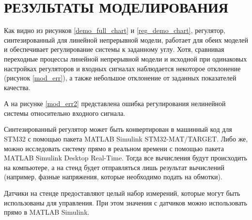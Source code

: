 \section{РЕЗУЛЬТАТЫ МОДЕЛИРОВАНИЯ}

Как видно из рисунков \ref{demo_full_chart} и \ref{reg_demo_chart}, регулятор, 
синтезированный
для линейной непрерывной модели, работает для обеих моделей и 
обеспечивает регулирование системы к заданному углу. Хотя, сравнивая
переходные процессы линейной непрерывной модели и исходной
при одинаковых настройках регуляторов и входных сигналах
наблюдается некоторое отклонение (рисунок \ref{mod_err}), а также 
небольшое отклонение от заданных показателей качества.


А на рисунке \ref{mod_err2} представлена ошибка
регулирования нелинейной системы относительно входного сигнала.


Синтезированный регулятор может быть конвертирован в машинный код
для STM32 с помощью пакета MATLAB Simulink \mbox{STM32-MAT/TARGET}.
Либо же, можно исследовать систему прямо в реальном времени с помощью
пакета MATLAB Simulink Desktop Real-Time. Тогда все вычисления будут
происходить на компьютере, а на стенд будет отправляться лишь результат 
вычислений (например, фазные напряжения, которые необходимо подать на обмотки).

Датчики на стенде предоставляют целый набор измерений, которые
могут быть использованы для управления. При этом значения с датчиков
можно использовать прямо в MATLAB Simulink.